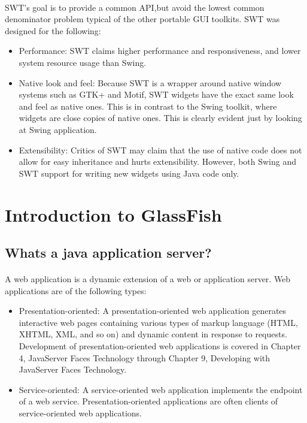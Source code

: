 \paragraph{}
SWT's goal is to provide a common API,but avoid the lowest common denominator problem typical of the other portable GUI toolkits. SWT was designed for the following:
\begin{itemize}
\item Performance: SWT claims higher performance and responsiveness, and lower system resource usage than Swing.

\item Native look and feel: Because SWT is a wrapper around native window systems such as GTK+ and Motif, SWT widgets have the exact same look and feel as native ones. This is in contrast to the Swing toolkit, where
widgets are close copies of native ones. This is clearly evident just by looking at Swing application.

\item Extensibility: Critics of SWT may claim that the use of native code does not allow for easy inheritance and hurts extensibility. However, both Swing and SWT support for writing new widgets using Java code only.
\end{itemize}

\section{Introduction to GlassFish}

\subsection{Whats a java application server?}
\paragraph{}
A web application is a dynamic extension of a web or application server. Web applications are of the following types:
\begin{itemize}
\item Presentation-oriented: A presentation-oriented web application generates interactive web pages containing various types of 
markup language (HTML, XHTML, XML, and so on) and dynamic content in response to requests. Development of presentation-oriented web 
applications is covered in Chapter 4, JavaServer Faces Technology through Chapter 9, Developing with JavaServer Faces Technology.

\item Service-oriented: A service-oriented web application implements the endpoint of a web service. Presentation-oriented applications
are often clients of service-oriented web applications. 
\end{itemize}

